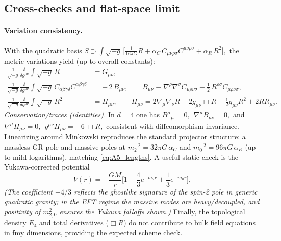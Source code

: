 \documentclass{iopjournal}
\begin{document}
\subsection{Cross-checks and flat-space limit}\label{app:A6}
\paragraph{Variation consistency.}
With the quadratic basis
\(
S\supset\int\!\sqrt{-g}\,\big[\tfrac{1}{16\pi G}R+\alpha_C\,C_{\mu\nu\rho\sigma}C^{\mu\nu\rho\sigma}+\alpha_R\,R^2\big],
\)
the metric variations yield (up to overall constants):
\begin{align}
\frac{1}{\sqrt{-g}}\frac{\delta}{\delta g^{\mu\nu}}\!\int\!\sqrt{-g}\,R
&= G_{\mu\nu}, \label{eq:A6_varEH}\\[2pt]
\frac{1}{\sqrt{-g}}\frac{\delta}{\delta g^{\mu\nu}}\!\int\!\sqrt{-g}\,C_{\alpha\beta\gamma\delta}C^{\alpha\beta\gamma\delta}
&= -\,2\,B_{\mu\nu}, \qquad
B_{\mu\nu}\equiv \nabla^\rho\nabla^\sigma C_{\mu\rho\nu\sigma}
+\tfrac{1}{2}\,R^{\rho\sigma} C_{\mu\rho\nu\sigma}, \label{eq:A6_varC2}\\[2pt]
\frac{1}{\sqrt{-g}}\frac{\delta}{\delta g^{\mu\nu}}\!\int\!\sqrt{-g}\,R^2
&= H_{\mu\nu}, \qquad
H_{\mu\nu}=2\nabla_\mu\nabla_\nu R-2g_{\mu\nu}\Box R-\tfrac{1}{2}g_{\mu\nu}R^2+2RR_{\mu\nu}. \label{eq:A6_varR2}
\end{align}
\emph{Conservation/traces (identities).}
In \(d=4\) one has
\(
B^\mu{}_\mu=0,\ \ \nabla^\mu B_{\mu\nu}=0,
\)
and
\(
\nabla^\mu H_{\mu\nu}=0,\ \ g^{\mu\nu}H_{\mu\nu}=-6\,\Box R,
\)
consistent with diffeomorphism invariance.  Linearizing around Minkowski reproduces the standard projector structure: a massless GR pole and massive poles at
\(m_2^{-2}=32\pi G\,\alpha_C\) and \(m_0^{-2}=96\pi G\,\alpha_R\) (up to mild logarithms), matching \eqref{eq:A5_lengths}.
A useful static check is the Yukawa-corrected potential
\begin{equation}
V(r)=-\frac{GM}{r}\Big[1-\frac{4}{3}e^{-m_2 r}+\frac{1}{3}e^{-m_0 r}\Big],
\label{eq:A6_NewtonYukawa}
\end{equation}
\emph{(The coefficient \(-4/3\) reflects the ghostlike signature of the spin-2 pole in generic quadratic gravity; in the EFT regime the massive modes are heavy/decoupled, and positivity of \(m_{2,0}^2\) ensures the Yukawa falloffs shown.)}
Finally, the topological density \(E_4\) and total derivatives (\(\Box R\)) do not contribute to bulk field equations in fmy dimensions, providing the expected scheme check.
\end{document}
